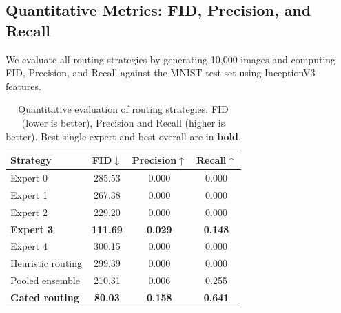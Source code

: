 \documentclass[11pt,a4paper]{article}
\begin{document}
\subsection{Quantitative Metrics: FID, Precision, and Recall}

We evaluate all routing strategies by generating 10,000 images and
computing FID, Precision, and Recall against the MNIST test set using
InceptionV3 features.

\begin{table}[ht]
  \centering
  \caption{Quantitative evaluation of routing strategies. FID (lower is
    better), Precision and Recall (higher is better). Best single-expert
    and best overall are in \textbf{bold}.}
  \label{tab:metrics}
  \begin{tabular}{lccc}
    \toprule
    \textbf{Strategy} & \textbf{FID}$\downarrow$
      & \textbf{Precision}$\uparrow$ & \textbf{Recall}$\uparrow$ \\
    \midrule
    Expert 0          & 285.53 & 0.000 & 0.000 \\
    Expert 1          & 267.38 & 0.000 & 0.000 \\
    Expert 2          & 229.20 & 0.000 & 0.000 \\
    \textbf{Expert 3} & \textbf{111.69} & \textbf{0.029} & \textbf{0.148} \\
    Expert 4          & 300.15 & 0.000 & 0.000 \\
    \midrule
    Heuristic routing & 299.39 & 0.000 & 0.000 \\
    Pooled ensemble   & 210.31 & 0.006 & 0.255 \\
    \textbf{Gated routing} & \textbf{80.03} & \textbf{0.158} & \textbf{0.641} \\
    \bottomrule
  \end{tabular}
\end{table}
\end{document}
